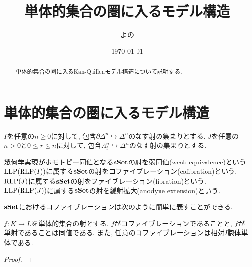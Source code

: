 \documentclass[uplatex, a4paper, 14Q, dvipdfmx]{jsarticle}
\title{単体的集合の圏に入るモデル構造}
\author{よの}
\date{\today}
\begin{document}
\maketitle

\begin{abstract}
  単体的集合の圏に入るKan-Quillenモデル構造について説明する. 
\end{abstract}

\tableofcontents

\section{単体的集合の圏に入るモデル構造}

$I$を任意の$n \geq 0$に対して, 包含$\partial \Delta^n \hookrightarrow \Delta^n$のなす射の集まりとする. 
$J$を任意の$n>0$と$0 \leq r \leq n$に対して, 包含$\Lambda^n_i \hookrightarrow \Delta^n$のなす射の集まりとする. 

\begin{definition}
  幾何学実現がホモトピー同値となる$\mathbf{sSet}$の射を弱同値(weak equivalence)という.
  $\mathrm{LLP}(\mathrm{RLP}(I))$に属する$\mathbf{sSet}$の射をコファイブレーション(cofibration)という.
  $\mathrm{RLP}(J)$に属する$\mathbf{sSet}$の射をファイブレーション(fibration)という.
  $\mathrm{LLP}(\mathrm{RLP}(J))$に属する$\mathbf{sSet}$の射を緩射拡大(anodyne extension)という.
\end{definition}

$\mathbf{sSet}$におけるコファイブレーションは次のように簡単に表すことができる.

\begin{proposition}
  $f : K \to L$を単体的集合の射とする. 
  $f$がコファイブレーションであることと, $f$が単射であることは同値である. 
  また, 任意のコファイブレーションは相対$I$胞体単体である.
\end{proposition}

\begin{proof}
  
\end{proof}
\end{document}
